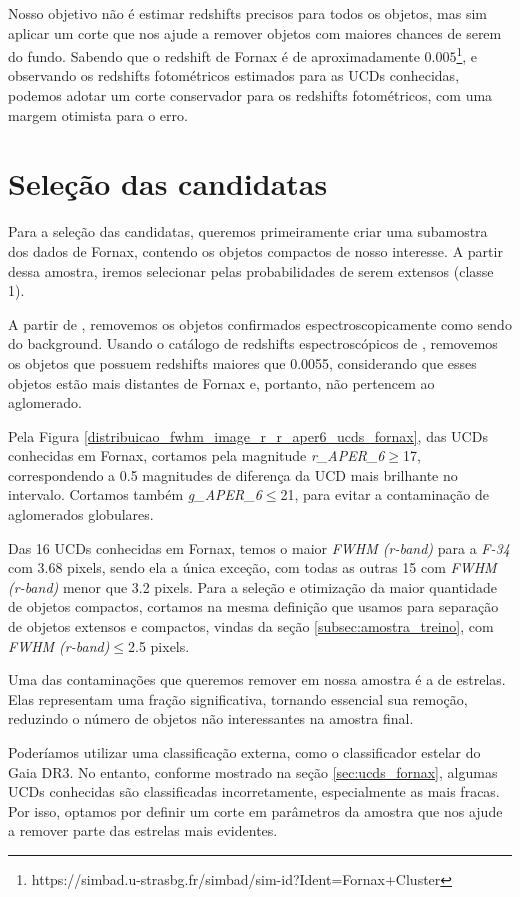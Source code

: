 Nosso objetivo não é estimar redshifts precisos para todos os objetos, mas sim aplicar um corte que nos ajude a remover objetos com maiores chances de serem do fundo. Sabendo que o redshift de Fornax é de aproximadamente $0.005$\footnote{https://simbad.u-strasbg.fr/simbad/sim-id?Ident=Fornax+Cluster}, e observando os redshifts fotométricos estimados para as UCDs conhecidas, podemos adotar um corte conservador para os redshifts fotométricos, com uma margem otimista para o erro.

\section{Seleção das candidatas}\label{cap:selecao_candidatas}
Para a seleção das candidatas, queremos primeiramente criar uma subamostra dos dados de Fornax, contendo os objetos compactos de nosso interesse. A partir dessa amostra, iremos selecionar pelas probabilidades de serem extensos (classe 1).

A partir de \cite{Su_2021}, removemos os objetos confirmados espectroscopicamente como sendo do background. Usando o catálogo de redshifts espectroscópicos de \cite{Lima_2024}, removemos os objetos que possuem redshifts maiores que 0.0055, considerando que esses objetos estão mais distantes de Fornax e, portanto, não pertencem ao aglomerado.

Pela Figura \ref{distribuicao_fwhm_image_r_r_aper6_ucds_fornax}, das UCDs conhecidas em Fornax, cortamos pela magnitude \textit{r\_APER\_6}$\geq$17, correspondendo a 0.5 magnitudes de diferença da UCD mais brilhante no intervalo. Cortamos também \textit{g\_APER\_6}$\leq$21, para evitar a contaminação de aglomerados globulares.

Das 16 UCDs conhecidas em Fornax, temos o maior \textit{FWHM (r-band)} para a \textit{F-34} com 3.68 pixels, sendo ela a única exceção, com todas as outras 15 com \textit{FWHM (r-band)} menor que 3.2 pixels. Para a seleção e otimização da maior quantidade de objetos compactos, cortamos na mesma definição que usamos para separação de objetos extensos e compactos, vindas da seção \ref{subsec:amostra_treino}, com \textit{FWHM (r-band)}$\leq$2.5 pixels.

Uma das contaminações que queremos remover em nossa amostra é a de estrelas. Elas representam uma fração significativa, tornando essencial sua remoção, reduzindo o número de objetos não interessantes na amostra final.

Poderíamos utilizar uma classificação externa, como o classificador estelar do Gaia DR3. No entanto, conforme mostrado na seção \ref{sec:ucds_fornax}, algumas UCDs conhecidas são classificadas incorretamente, especialmente as mais fracas. Por isso, optamos por definir um corte em parâmetros da amostra que nos ajude a remover parte das estrelas mais evidentes.

